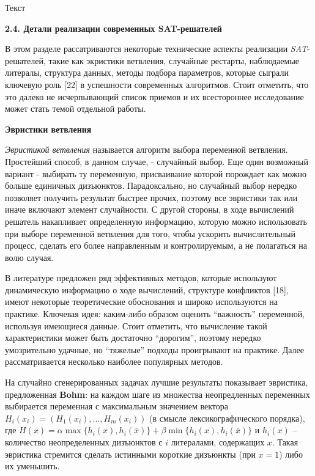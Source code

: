 Текст

\vspace{5pt}
\textbf{2.4. Детали реализации современных SAT-решателей}\label{chapters:2.4}
\vspace{5pt}

В этом разделе рассатриваются некоторые технические аспекты реализации \textit{SAT}-решателей, такие как экристики ветвления, случайные рестарты, наблюдаемые литералы, структура данных, методы подбора параметров, которые сыграли ключевую роль [22] в успешности современных алгоритмов. Стоит отметить, что это далеко не исчерпывающий список приемов и их всестороннее исследование может стать темой отдельной работы.

\textbf{Эвристики ветвления}

\textit{Эвристикой ветвления} называется алгоритм выбора переменной ветвления. Простейший способ, в данном случае, - случайный выбор. Еще один возможный вариант - выбирать ту переменную, присваивание которой порождает как можно больше единичных дизъюнктов.
Парадоксально, но случайный выбор нередко позволяет получить результат быстрее прочих, поэтому все эвристики так или иначе включают элемент случайности. 
С другой стороны, в ходе вычислений решатель накапливает определенную информацию, которую можно использовать при выборе переменной ветвления для того, чтобы ускорить вычислительный процесс, сделать его более направленным и контролируемым, а не полагаться на волю случая. 

В литературе предложен ряд эффективных методов, которые используют динамическую информацию о ходе вычислений, структуре конфликтов [18], имеют некоторые теоретические обоснования и широко используются на практике. Ключевая идея: каким-либо образом оценить \enquote{важность} переменной, используя имеющиеся данные. Стоит отметить, что вычисление такой характеристики может быть достаточно \enquote{дорогим}, поэтому нередко умозрительно удачные, но \enquote{тяжелые} подходы проигрывают на практике. Далее рассматривается несколько наиболее популярных методов.

На случайно сгенерированных задачах лучшие результаты показывает эвристика, предложенная \textbf{Bohm}: на каждом шаге из множества неопредленных переменных выбирается переменная с максимальным значением вектора 
$H_i(x_i) = \left(H_1(x_i), \dots, H_m(x_i)\right)$ 
(в смысле лексикографического порядка), где
$H(x) = \alpha \max \{ h_i(x), h_i(\overline{x}) \} + \beta \min \{ h_i(x), h_i(\overline{x}) \}$
и $h_i(x)$ – количество неопределенных дизъюнктов с $i$ литералами, содержащих $x$.
Такая эвристика стремится сделать истинными короткие дизъюнкты (при $x=1$) либо их уменьшить.

